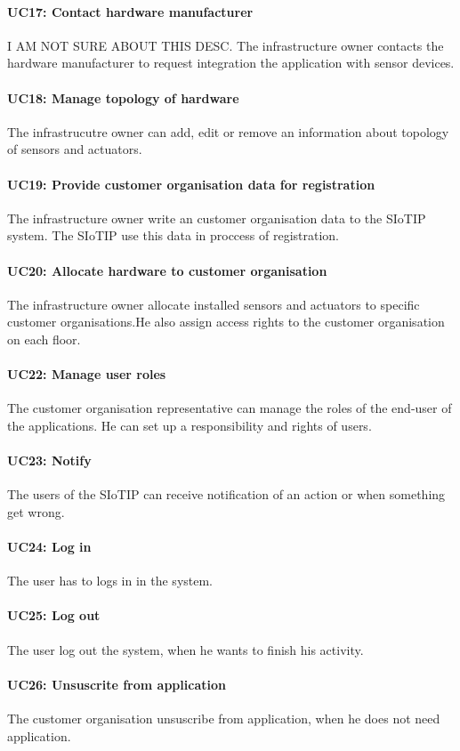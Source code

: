 \paragraph{UC17: Contact hardware manufacturer}
I AM NOT SURE ABOUT THIS DESC. The infrastructure owner contacts the hardware
manufacturer to request integration the application with sensor devices. 
\paragraph{UC18: Manage topology of hardware}
The infrastrucutre owner can add, edit or remove an information about topology 
of sensors and actuators.
\paragraph{UC19: Provide customer organisation data for registration}
The infrastructure owner write an customer organisation data to the SIoTIP system.
The SIoTIP use this data in proccess of registration.
\paragraph{UC20: Allocate hardware to customer organisation}
The infrastructure owner allocate installed sensors and actuators to specific customer
organisations.He also assign access rights to the customer organisation on each floor.
\paragraph{UC22: Manage user roles}
The customer organisation representative can manage the roles of the end-user of the applications.
He can set up a responsibility and rights of users.
\paragraph{UC23: Notify}
The users of the SIoTIP can receive notification of an action or when something get
wrong.
\paragraph{UC24: Log in}
The user has to logs in in the system.
\paragraph{UC25: Log out}
The user log out the system, when he wants to finish his activity.
\paragraph{UC26: Unsuscrite from application}
The customer organisation unsuscribe from application, when he does not need application.
